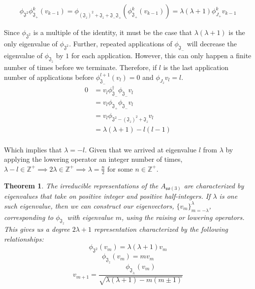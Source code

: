 \documentclass[10pt]{ucthesis}
\newcommand{\Z}{\mathbb{Z}}
\newtheorem{theorem}[definition]{Theorem}
\begin{document}
\begin{equation}
	\begin{aligned}
		\phi_{\mathfrak{J^2}}\phi_{\mathfrak{J}_+}^k(v_{k-1}) = \phi_{(\mathfrak{J}_z)^2 +\mathfrak{J}_z+ \mathfrak{J}_-\mathfrak{J}_+}(\phi_{\mathfrak{J}_+}^k(v_{k-1})) = \lambda(\lambda + 1) \phi_{J_+}^kv_{k-1}
	\end{aligned}
\end{equation} 

Since $\phi_{\mathfrak{J^2}}$ is a multiple of the identity, it must be the case that $\lambda(\lambda +1)$ is the only eigenvalue of $\phi_{\mathfrak{J^2}}$. Further, repeated applications of $\phi_{\mathfrak{J}_-}$ will decrease the eigenvalue of $\phi_{\mathfrak{J}_z}$ by $1$ for each application. However, this can only happen a finite number of times before we terminate. Therefore, if $l$ is the last application number of applications before  $\phi_{\mathfrak{J}_-}^{l+1}(v_{l}) = 0$ and $\phi_{J_z}v_l = l$.
\begin{equation}
	\begin{aligned}
		0 &= v_{l}  \phi_{\mathfrak{J}_-}^\dag \phi_{\mathfrak{J}_-} v_{l} \\
		&= v_{l} \phi_{\mathfrak{J}_+}\phi_{\mathfrak{J}_-}v_{l} \\
			&= v_{l}\phi_{\mathfrak{J^2} - (\mathfrak{J}_z)^2 + \mathfrak{J}_z}v_{l} \\
		&= \lambda(\lambda+ 1) - l(l - 1)\\
	\end{aligned}
\end{equation} 

Which implies that $\lambda = -l$. Given that we arrived at eigenvalue $l$ from $\lambda$ by applying the lowering operator an integer number of times, $\lambda - l \in \Z^+ \implies 2\lambda\in\Z^+ \implies \lambda = \frac{n}{2}$ for some $n\in\Z^+.$


\begin{theorem}
	The irreducible representations of the $A_\mathfrak{so(3)}$ are characterized by eigenvalues that take on positive integer and positive half-integers. If $\lambda$ is one such eigenvalue, then we can construct our eigenvectors, $\{v_m\}_{m=-\lambda}^\lambda$, corresponding to $\phi_{\mathfrak{J}_z}$ with eigenvalue $m$, using the raising or lowering operators. This gives us a degree $2\lambda +1$ representation characterized by the following relationships:
$$\phi_{\mathfrak{J}^2}(v_m) = \lambda(\lambda+1)v_m$$
$$\phi_{\mathfrak{J}_z}(v_m) =  mv_m$$ 
$$v_{m+1} =  \frac{\phi_{\mathfrak{J}_\pm}(v_m)}{\sqrt{\lambda(\lambda+1) - m(m\pm 1)}}$$
\end{theorem}
\end{document}
